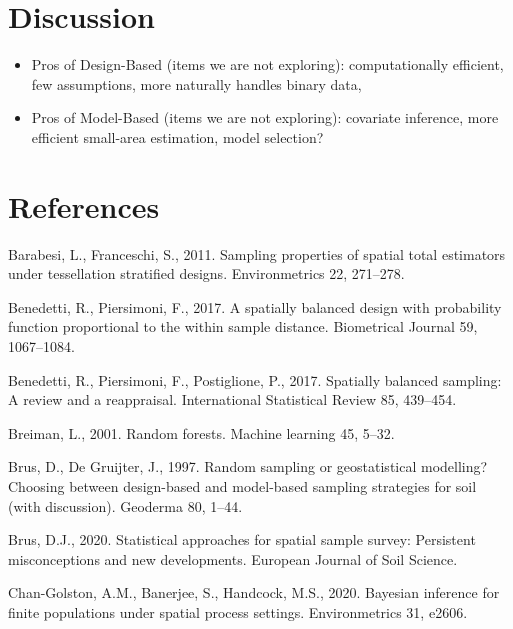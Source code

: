 \documentclass[]{elsarticle} %
\begin{document}
\hypertarget{sec:discussion}{%
\section{Discussion}\label{sec:discussion}}

\begin{itemize}
\item
  Pros of Design-Based (items we are not exploring): computationally
  efficient, few assumptions, more naturally handles binary data,
\item
  Pros of Model-Based (items we are not exploring): covariate inference,
  more efficient small-area estimation, model selection?
\end{itemize}

\hypertarget{references}{%
\section*{References}\label{references}}

\hypertarget{refs}{}
\leavevmode\hypertarget{ref-barabesi2011sampling}{}%
Barabesi, L., Franceschi, S., 2011. Sampling properties of spatial total
estimators under tessellation stratified designs. Environmetrics 22,
271--278.

\leavevmode\hypertarget{ref-benedetti2017spatially}{}%
Benedetti, R., Piersimoni, F., 2017. A spatially balanced design with
probability function proportional to the within sample distance.
Biometrical Journal 59, 1067--1084.

\leavevmode\hypertarget{ref-benedetti2017spatiallyreview}{}%
Benedetti, R., Piersimoni, F., Postiglione, P., 2017. Spatially balanced
sampling: A review and a reappraisal. International Statistical Review
85, 439--454.

\leavevmode\hypertarget{ref-breiman2001random}{}%
Breiman, L., 2001. Random forests. Machine learning 45, 5--32.

\leavevmode\hypertarget{ref-brus1997random}{}%
Brus, D., De Gruijter, J., 1997. Random sampling or geostatistical
modelling? Choosing between design-based and model-based sampling
strategies for soil (with discussion). Geoderma 80, 1--44.

\leavevmode\hypertarget{ref-brus2020statistical}{}%
Brus, D.J., 2020. Statistical approaches for spatial sample survey:
Persistent misconceptions and new developments. European Journal of Soil
Science.

\leavevmode\hypertarget{ref-chan2020bayesian}{}%
Chan-Golston, A.M., Banerjee, S., Handcock, M.S., 2020. Bayesian
inference for finite populations under spatial process settings.
Environmetrics 31, e2606.
\end{document}
